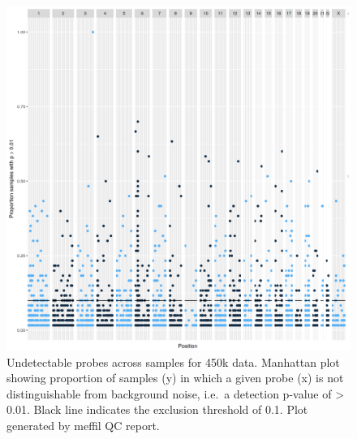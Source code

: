 \documentclass[
]{book}
\begin{document}
\begin{figure}

{\centering \includegraphics[width=0.8\linewidth]{figs/MAVIDOSqc450kpropSamples} 

}

\caption{Undetectable probes across samples for 450k data. Manhattan plot showing proportion of samples (y) in which a given probe (x) is not distinguishable from background noise, i.e.~a detection p-value of \textgreater{} 0.01. Black line indicates the exclusion threshold of 0.1. Plot generated by meffil QC report.}\label{fig:MAVIDOSqc450kpropSamples}
\end{figure}
\end{document}

